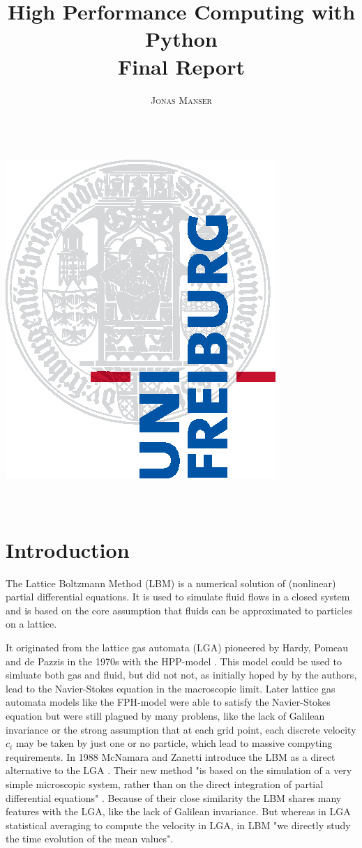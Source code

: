 \documentclass[a4paper,11pt]{report}
\title{\Huge \textbf{High Performance Computing with Python} \vspace{4mm} \\ \huge Final Report}
\author{\textsc{Jonas Manser} \\ \vspace{3mm}\text{matriculation number}  \\
\vspace{3mm}\text{jonas.burster@gmail.com}}
\begin{document}
\makeatletter
\begin{titlepage}
    \begin{center}
        \includegraphics[width=0.5\linewidth]{logos/Uni_Logo-Grundversion_E1_A4_CMYK.eps}\\[4ex]
        {\huge \bfseries  \@title }\\[2ex]
        {\LARGE  \@author}\\[30ex]
        {\large \@date}
    \end{center}
\end{titlepage}
\makeatother
\thispagestyle{empty}
\newpage



\tableofcontents


\section{Introduction}
The Lattice Boltzmann Method (LBM) is a numerical solution of (nonlinear) partial differential equations.
It is used to simulate fluid flows in a closed system and is based on the core assumption that fluids can be approximated to particles on a lattice.

It originated from the lattice gas automata (LGA) pioneered by Hardy, Pomeau and de Pazzis in the 1970s with the HPP-model \cite{hardy1973timeHPP}.
This model could be used to simluate both gas and fluid, but did not not, as initially hoped by by the authors, lead to the Navier-Stokes equation in the macroscopic limit.
Later lattice gas automata models like the FPH-model \cite{PhysRevLett.56.1505-fhp} were able to satisfy the Navier-Stokes equation but were still plagued by many problens, like the lack of Galilean invariance\cite{nie2008galileanInvariance} or the strong assumption that at each grid point, each discrete velocity $c_i$ may be taken by just one or no particle\cite{IIISELEC71:online-univie}, which lead to massive compyting requirements.
In 1988 McNamara and Zanetti introduce the LBM as a direct alternative to the LGA \cite{mcnamara1988boltzmann-method}.
Their new method "is based on the simulation of a very simple microscopic system, rather than on the direct integration of partial differential equations" \cite{mcnamara1988boltzmann-method}.
Because of their close similarity the LBM shares many features with the LGA, like the lack of Galilean invariance.
But whereas in LGA statistical averaging to compute the velocity in LGA, in LBM "we directly study the time evolution of the mean values"\cite{mcnamara1988boltzmann-method}.
\end{document}
